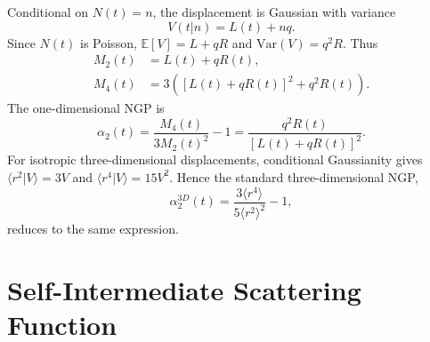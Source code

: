 \documentclass[aps,preprint,onecolumn,superscriptaddress,nofootinbib]{revtex4-2}
\begin{document}
Conditional on $N(t)=n$, the displacement is Gaussian with variance
\begin{equation}
  V(t|n)=L(t)+nq.
\end{equation}
Since $N(t)$ is Poisson, $\mathbb{E}[V]=L+qR$ and
$\mathrm{Var}(V)=q^2R$. Thus
\begin{align}
  M_2(t) &= L(t)+qR(t),\\
  M_4(t) &= 3\left([L(t)+qR(t)]^2+q^2R(t)\right).
\end{align}
The one-dimensional NGP is
\begin{equation}
  \alpha_2(t)=\frac{M_4(t)}{3M_2(t)^2}-1
  =\frac{q^2R(t)}{[L(t)+qR(t)]^2}.
\end{equation}
For isotropic three-dimensional displacements, conditional Gaussianity gives
$\langle r^2|V\rangle=3V$ and $\langle r^4|V\rangle=15V^2$. Hence the standard
three-dimensional NGP,
\begin{equation}
  \alpha_2^{3D}(t)=\frac{3\langle r^4\rangle}{5\langle r^2\rangle^2}-1,
\end{equation}
reduces to the same expression.

\section{Self-Intermediate Scattering Function}
\end{document}
